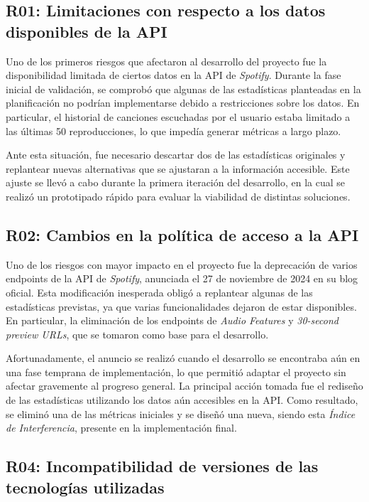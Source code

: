 \newpage

\subsection*{R01: Limitaciones con respecto a los datos disponibles de la API}

Uno de los primeros riesgos que afectaron al desarrollo del proyecto fue la disponibilidad limitada de ciertos datos en la API de \textit{Spotify}. Durante la fase inicial de validación, se comprobó que algunas de las estadísticas planteadas en la planificación no podrían implementarse debido a restricciones sobre los datos. En particular, el historial de canciones escuchadas por el usuario estaba limitado a las últimas 50 reproducciones, lo que impedía generar métricas a largo plazo.

Ante esta situación, fue necesario descartar dos de las estadísticas originales y replantear nuevas alternativas que se ajustaran a la información accesible. Este ajuste se llevó a cabo durante la primera iteración del desarrollo, en la cual se realizó un prototipado rápido para evaluar la viabilidad de distintas soluciones.

\subsection*{R02: Cambios en la política de acceso a la API}

Uno de los riesgos con mayor impacto en el proyecto fue la deprecación de varios endpoints de la API de \textit{Spotify}, anunciada el 27 de noviembre de 2024 en su blog oficial. Esta modificación inesperada obligó a replantear algunas de las estadísticas previstas, ya que varias funcionalidades dejaron de estar disponibles. En particular, la eliminación de los endpoints de \textit{Audio Features} y \textit{30-second preview URLs}, que se tomaron como base para el desarrollo.

Afortunadamente, el anuncio se realizó cuando el desarrollo se encontraba aún en una fase temprana de implementación, lo que permitió adaptar el proyecto sin afectar gravemente al progreso general. La principal acción tomada fue el rediseño de las estadísticas utilizando los datos aún accesibles en la API. Como resultado, se eliminó una de las métricas iniciales y se diseñó una nueva, siendo esta \textit{Índice de Interferencia}, presente en la implementación final.

\subsection*{R04: Incompatibilidad de versiones de las tecnologías utilizadas}

